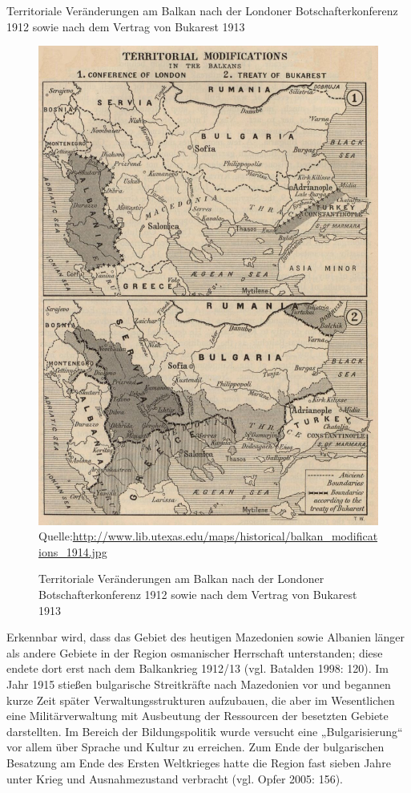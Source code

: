 Territoriale Veränderungen am Balkan nach der Londoner Botschafterkonferenz 1912 sowie nach dem Vertrag von Bukarest 1913
\begin{figure}[H]
  \centering
   \caption[Territoriale Veränderungen am Balkan nach der Londoner Botschafterkonferenz 1912 sowie nach dem Vertrag von Bukarest 1913]{Territoriale Veränderungen am Balkan nach der Londoner Botschafterkonferenz 1912 sowie nach dem Vertrag von Bukarest 1913}
   \includegraphics[width=5in]{Material/balkan_modifications_1914.jpg}
  \scriptsize{Quelle:\url{http://www.lib.utexas.edu/maps/historical/balkan_modifications_1914.jpg}}
\end{figure}

Erkennbar wird, dass das Gebiet des heutigen Mazedonien sowie Albanien länger als andere Gebiete in der Region osmanischer Herrschaft unterstanden; diese endete dort erst nach dem Balkankrieg 1912/13 (vgl. Batalden 1998: 120). Im Jahr 1915 stießen bulgarische Streitkräfte nach Mazedonien vor und begannen kurze Zeit später Verwaltungsstrukturen aufzubauen, die aber im Wesentlichen eine Militärverwaltung mit Ausbeutung der Ressourcen der besetzten Gebiete darstellten. Im Bereich der Bildungspolitik wurde versucht eine „Bulgarisierung“ vor allem über Sprache und Kultur zu erreichen. Zum Ende der bulgarischen Besatzung am Ende des Ersten Weltkrieges hatte die Region fast sieben Jahre unter Krieg und Ausnahmezustand verbracht (vgl. Opfer 2005: 156).
